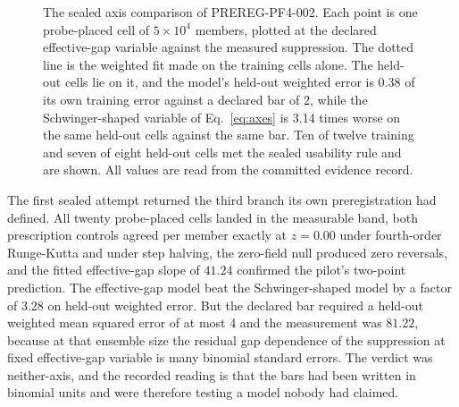 \documentclass[aps,pre,reprint,nofootinbib,floatfix]{revtex4-2}
\begin{document}
\begin{figure}[t]
\centering
{}
\caption{The sealed axis comparison of PREREG-PF4-002.  Each point is
one probe-placed cell of $5 \times 10^4$ members, plotted at the
declared effective-gap variable against the measured suppression.  The
dotted line is the weighted fit made on the training cells alone.  The
held-out cells lie on it, and the model's held-out weighted error is
0.38 of its own training error against a declared bar of 2, while the
Schwinger-shaped variable of Eq.~\eqref{eq:axes} is 3.14 times worse on
the same held-out cells against the same bar.  Ten of twelve training
and seven of eight held-out cells met the sealed usability rule and are
shown.  All values are read from the committed evidence record.}
\label{fig:pf4}
\end{figure}

The first sealed attempt returned the third branch its own
preregistration had defined.  All twenty probe-placed cells landed in
the measurable band, both prescription controls agreed per member
exactly at $z = 0.00$ under fourth-order Runge-Kutta and under step
halving, the zero-field null produced zero reversals, and the fitted
effective-gap slope of $41.24$ confirmed the pilot's two-point
prediction.  The effective-gap model beat the Schwinger-shaped model by
a factor of $3.28$ on held-out weighted error.  But the declared bar
required a held-out weighted mean squared error of at most 4 and the
measurement was $81.22$, because at that ensemble size the residual gap
dependence of the suppression at fixed effective-gap variable is many
binomial standard errors.  The verdict was neither-axis, and the
recorded reading is that the bars had been written in binomial units
and were therefore testing a model nobody had claimed.
\end{document}
